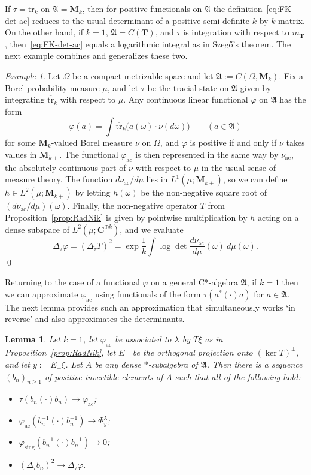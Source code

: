 \documentclass[12pt,a4paper]{article}
\numberwithin{equation}{section}
\newtheorem{lem}[thm]{Lemma}
\theoremstyle{remark}
\newtheorem{ex}[thm]{Example}
\renewcommand{\rm}[1]{\mathrm{#1}}
\newcommand{\bbC}{\mathbf{C}}
\newcommand{\bbT}{\mathbf{T}}
\newcommand{\rmM}{\mathbf{M}}
\newcommand{\A}{\mathfrak{A}}
\renewcommand{\phi}{\varphi}
\renewcommand{\l}{\lambda}
\renewcommand{\t}[1]{\widetilde{#1}}
\newcommand{\tr}{\overline{\mathrm{tr}}}
\begin{document}
If $\tau = \tr_k$ on $\A = \rmM_k$, then for positive functionals on $\A$ the definition~\eqref{eq:FK-det-ac} reduces to the usual determinant of a positive semi-definite $k$-by-$k$ matrix.  On the other hand, if $k=1$, $\A = C(\bbT)$, and $\tau$ is integration with respect to $m_\bbT$, then~\eqref{eq:FK-det-ac} equals a logarithmic integral as in Szeg\H{o}'s theorem.  The next example combines and generalizes these two.

\begin{ex}\label{ex:mat-val-fn}
Let $\Omega$ be a compact metrizable space and let $\A := C(\Omega,\rmM_k)$.  Fix a Borel probability measure $\mu$, and let $\tau$ be the tracial state on $\A$ given by integrating $\tr_k$ with respect to $\mu$.  Any continuous linear functional $\phi$ on $\A$ has the form
\[\phi(a) = \int \tr_k\big(a(\omega)\cdot \nu(d\omega)\big) \qquad (a \in \A)\]
for some $\rmM_k$-valued Borel measure $\nu$ on $\Omega$, and $\phi$ is positive if and only if $\nu$ takes values in $\rmM_{k+}$. The functional $\phi_{\rm{ac}}$ is then represented in the same way by $\nu_{\rm{ac}}$, the absolutely continuous part of $\nu$ with respect to $\mu$ in the usual sense of measure theory.  The function $d\nu_{\rm{ac}}/d\mu$ lies in $L^1(\mu;\rmM_{k+})$, so we can define $h \in L^2(\mu;\rmM_{k+})$ by letting $h(\omega)$ be the non-negative square root of $(d\nu_{\rm{ac}}/d\mu)(\omega)$.  Finally, the non-negative operator $T$ from Proposition~\ref{prop:RadNik} is given by pointwise multiplication by $h$ acting on a dense subspace of $L^2(\mu;\bbC^{\oplus k})$, and we evaluate
\[\Delta_\tau \phi = (\Delta_{\t{\tau}}T)^2 = \exp \frac{1}{k}\int \log \det \frac{d\nu_{\rm{ac}}}{d\mu}(\omega)\ d\mu(\omega).\]
\qed
\end{ex}

Returning to the case of a functional $\phi$ on a general C*-algebra $\A$, if $k=1$ then we can approximate $\phi_{\rm{ac}}$ using functionals of the form $\tau(a^\ast(\cdot)a)$ for $a \in \A$.  The next lemma provides such an approximation that simultaneously works `in reverse' and also approximates the determinants.

\begin{lem}\label{lem:Kap+2}
Let $k=1$, let $\phi_{\rm{ac}}$ be associated to $\l$ by $T\xi$ as in Proposition~\ref{prop:RadNik}, let $E_+$ be the orthogonal projection onto $(\ker T)^\perp$, and let $y := E_+\xi$.  Let $A$ be any dense $\ast$-subalgebra of $\A$. Then there is a sequence $(b_n)_{n\ge 1}$ of positive invertible elements of $A$ such that all of the following hold:
\begin{itemize}
\item[i.] $\tau(b_n(\cdot)b_n) \to \phi_{\rm{ac}}$;
\item[ii.] $\phi_{\rm{ac}}(b_n^{-1}(\cdot) b_n^{-1}) \to \Phi^\l_y$;
\item[iii.] $\phi_{\rm{sing}}(b_n^{-1}(\cdot) b_n^{-1}) \to 0$;
\item[iv.] $(\Delta_\tau b_n)^2 \to \Delta_\tau \phi$.
\end{itemize}
\end{lem}
\end{document}
